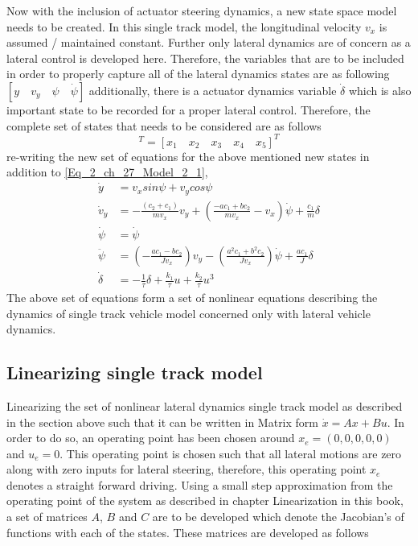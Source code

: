 Now with the inclusion of actuator steering dynamics, a new state space model needs to be created. In this single track model, the longitudinal velocity $v_x$ is assumed / maintained constant. Further only lateral dynamics are of concern as a lateral control is developed here. Therefore, the variables that are to be included in order to properly capture all of the lateral dynamics states are as following $[y \quad v_y \quad \psi \quad \dot{\psi}]$ additionally, there is a actuator dynamics variable $\dot{\delta}$ which is also important state to be recorded for a proper lateral control. Therefore, the complete set of states that needs to be considered are as follows
\begin{equation}
	[y \quad v_y \quad \psi \quad \dot{\psi} \quad \delta]^{T} = [x_1 \quad x_2 \quad x_3 \quad x_4 \quad x_5]^{T}
\end{equation}
re-writing the new set of equations for the above mentioned new states in addition to \eqref{Eq_2_ch_27_Model_2_1},
\begin{align}
	\dot{y} &= v_x sin\psi + v_y cos\psi \\
	\dot{v}_y &= -\frac{(c_2 + c_1)}{m v_x} v_y + \left(\frac{-a c_1 + b c_2}{m v_x} -v_x\right)\dot{\psi} + \frac{c_1}{m} \delta \\
	\dot{\psi} &= \dot{\psi} \\
	\ddot{\psi} &= \left(-\frac{a c_1 - b c_2}{J v_x}\right)v_y - \left(\frac{a^2 c_1 + b^2 c_2}{J v_x}\right) \dot{\psi} + \frac{a c_1}{J} \delta \\
	\dot{\delta} &= -\frac{1}{\tau} \delta + \frac{k_1}{\tau} u + \frac{k_2}{\tau}u^{3}
\end{align}
The above set of equations form a set of nonlinear equations describing the dynamics of single track vehicle model concerned only with lateral vehicle dynamics. 

\subsection{Linearizing single track model}
Linearizing the set of nonlinear lateral dynamics single track model as described in the section above such that it can be written in Matrix form $\dot{x} = Ax + Bu$. In order to do so, an operating point has been chosen around $x_e = (0,0,0,0,0)$ and $u_e = 0$. This operating point is chosen such that all lateral motions are zero along with zero inputs for lateral steering, therefore, this operating point $x_e$ denotes a straight forward driving. Using a small step approximation from the operating point of the system as described in chapter Linearization in this book, a set of matrices $A$, $B$ and $C$ are to be developed which denote the Jacobian's of functions with each of the states. These matrices are developed as follows

